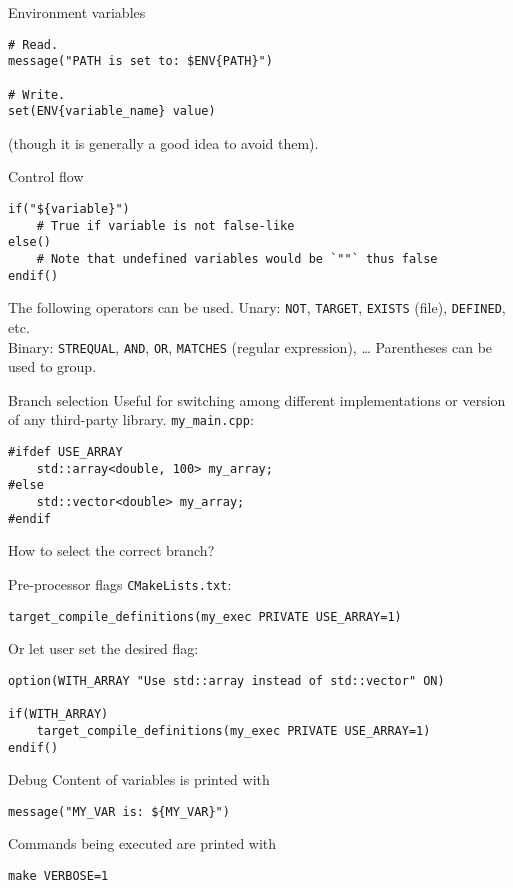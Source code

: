 \documentclass[aspectratio=169,11pt]{beamer}
\begin{document}
\begin{frame}[fragile]{Environment variables}
\begin{verbatim}
# Read.
message("PATH is set to: $ENV{PATH}")

# Write.
set(ENV{variable_name} value)
\end{verbatim}

(though it is generally a good idea to avoid them).
\end{frame}

\begin{frame}[fragile]{Control flow}
\begin{verbatim}
if("${variable}")
    # True if variable is not false-like
else()
    # Note that undefined variables would be `""` thus false
endif()
\end{verbatim}
\vfill
The following operators can be used.
\vfill
Unary: \texttt{NOT}, \texttt{TARGET}, \texttt{EXISTS} (file), \texttt{DEFINED}, etc.\\
Binary: \texttt{STREQUAL}, \texttt{AND}, \texttt{OR}, \texttt{MATCHES} (regular expression), \dots
\vfill
Parentheses can be used to group.
\end{frame}

\begin{frame}[fragile]{Branch selection}
Useful for switching among different implementations or version of any third-party library.
\vfill
\texttt{my\_main.cpp}:
\begin{verbatim}
#ifdef USE_ARRAY
    std::array<double, 100> my_array;
#else
    std::vector<double> my_array;
#endif
\end{verbatim}

How to select the correct branch?
\end{frame}

\begin{frame}[fragile]{Pre-processor flags}
\texttt{CMakeLists.txt}:
\begin{verbatim}
target_compile_definitions(my_exec PRIVATE USE_ARRAY=1)
\end{verbatim}
Or let user set the desired flag:
\begin{verbatim}
option(WITH_ARRAY "Use std::array instead of std::vector" ON)

if(WITH_ARRAY)
    target_compile_definitions(my_exec PRIVATE USE_ARRAY=1)
endif()
\end{verbatim}
\end{frame}

\begin{frame}[fragile]{Debug}
Content of variables is printed with
\begin{verbatim}
message("MY_VAR is: ${MY_VAR}")
\end{verbatim}
\vfill
Commands being executed are printed with
\begin{verbatim}
make VERBOSE=1
\end{verbatim}
\end{frame}
\end{document}
